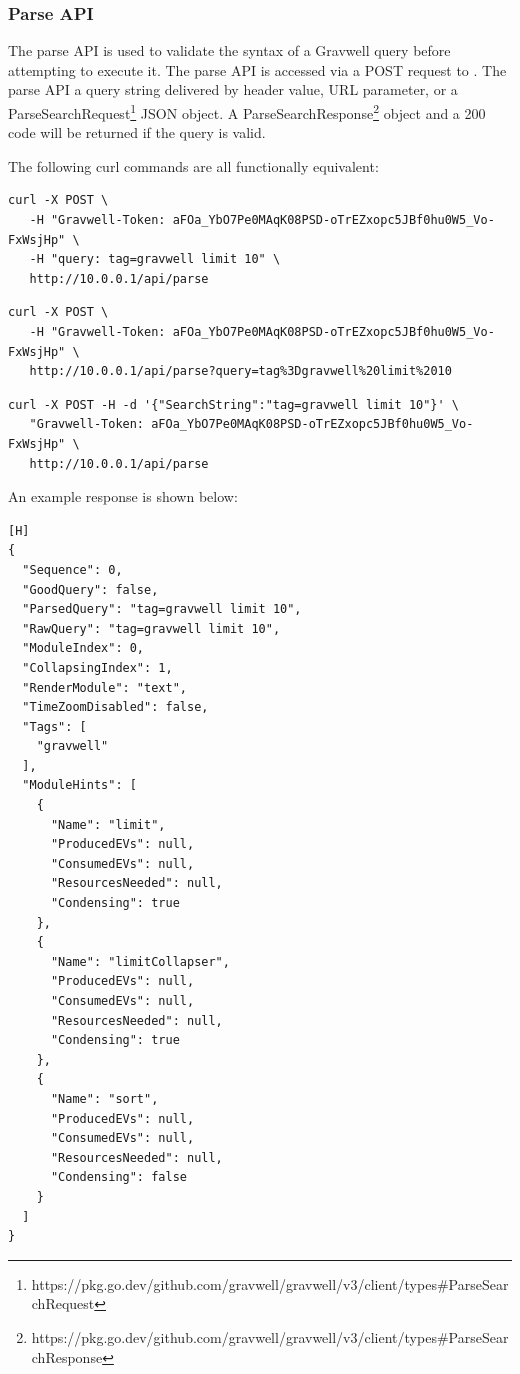 \subsubsection{Parse API}
The parse API is used to validate the syntax of a Gravwell query before attempting to execute it. The parse API is accessed via a POST request to .  The parse API a query string delivered by header value, URL parameter, or a ParseSearchRequest\footnote{https://pkg.go.dev/github.com/gravwell/gravwell/v3/client/types\#ParseSearchRequest} JSON object.  A ParseSearchResponse\footnote{https://pkg.go.dev/github.com/gravwell/gravwell/v3/client/types\#ParseSearchResponse} object and a 200 code will be returned if the query is valid.

The following curl commands are all functionally equivalent:

\begin{verbatim}
curl -X POST \
   -H "Gravwell-Token: aFOa_YbO7Pe0MAqK08PSD-oTrEZxopc5JBf0hu0W5_Vo-FxWsjHp" \
   -H "query: tag=gravwell limit 10" \
   http://10.0.0.1/api/parse
\end{verbatim}

\begin{verbatim}
curl -X POST \
   -H "Gravwell-Token: aFOa_YbO7Pe0MAqK08PSD-oTrEZxopc5JBf0hu0W5_Vo-FxWsjHp" \
   http://10.0.0.1/api/parse?query=tag%3Dgravwell%20limit%2010
\end{verbatim}

\begin{verbatim}
curl -X POST -H -d '{"SearchString":"tag=gravwell limit 10"}' \
   "Gravwell-Token: aFOa_YbO7Pe0MAqK08PSD-oTrEZxopc5JBf0hu0W5_Vo-FxWsjHp" \
   http://10.0.0.1/api/parse
\end{verbatim}

An example response is shown below:

\begin{verbatim}[H]
{
  "Sequence": 0,
  "GoodQuery": false,
  "ParsedQuery": "tag=gravwell limit 10",
  "RawQuery": "tag=gravwell limit 10",
  "ModuleIndex": 0,
  "CollapsingIndex": 1,
  "RenderModule": "text",
  "TimeZoomDisabled": false,
  "Tags": [
    "gravwell"
  ],
  "ModuleHints": [
    {
      "Name": "limit",
      "ProducedEVs": null,
      "ConsumedEVs": null,
      "ResourcesNeeded": null,
      "Condensing": true
    },
    {
      "Name": "limitCollapser",
      "ProducedEVs": null,
      "ConsumedEVs": null,
      "ResourcesNeeded": null,
      "Condensing": true
    },
    {
      "Name": "sort",
      "ProducedEVs": null,
      "ConsumedEVs": null,
      "ResourcesNeeded": null,
      "Condensing": false
    }
  ]
}
\end{verbatim}

